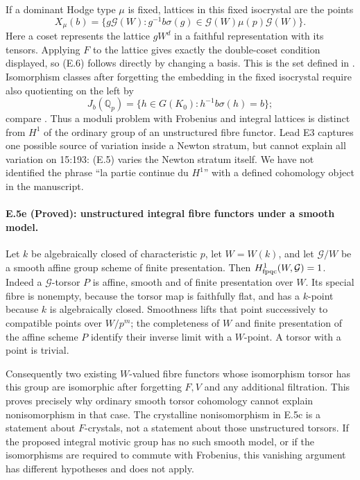 If a dominant Hodge type $\mu$ is fixed, lattices in this fixed isocrystal
are the points
\[
 X_\mu(b)=\{g\mathcal G(W):
   g^{-1}b\sigma(g)\in\mathcal G(W)\mu(p)\mathcal G(W)\}.
 \tag{E.6}
\]
Here a coset represents the lattice $gW^d$ in a faithful representation
with its tensors. Applying $F$ to the lattice gives exactly the
double-coset condition displayed, so (E.6) follows directly by changing
a basis. This is the set defined in
\citet[\S1.2.9, author-PDF p.~14]{Kisin2017}.
Isomorphism classes after forgetting the embedding in the
fixed isocrystal require also quotienting on the left by
\[
 J_b(\mathbb Q_p)=\{h\in G(K_0):h^{-1}b\sigma(h)=b\};
\]
compare \citet[\S1.2.12, author-PDF p.~14]{Kisin2017}.
Thus a moduli problem with Frobenius and integral lattices is distinct
from $H^1$ of the ordinary group of an unstructured fibre functor.
Lead E3 captures one possible source of variation inside a Newton
stratum, but cannot explain all variation on 15:193: (E.5) varies the
Newton stratum itself. We have not identified the phrase
``la partie continue du $H^1$'' with a defined cohomology object in the
manuscript.

\paragraph{E.5e (Proved): unstructured integral fibre functors under a smooth model.}
Let $k$ be algebraically closed of characteristic $p$, let $W=W(k)$,
and let $\mathcal G/W$ be a smooth affine group scheme of finite
presentation. Then
$H^1_{\rm fpqc}(W,\mathcal G)=1$.
Indeed a $\mathcal G$-torsor $P$ is affine, smooth and of finite
presentation over $W$. Its special fibre is nonempty, because the
torsor map is faithfully flat, and has a $k$-point because $k$ is
algebraically closed. Smoothness lifts that point successively to
compatible points over $W/p^m$; the completeness of $W$ and finite
presentation of the affine scheme $P$ identify their inverse limit
with a $W$-point. A torsor with a point is trivial.

Consequently two existing $W$-valued fibre functors whose isomorphism
torsor has this group are isomorphic after forgetting $F,V$ and any
additional filtration. This proves precisely why ordinary smooth
torsor cohomology cannot explain nonisomorphism in that case. The
crystalline nonisomorphism in E.5c is a statement about $F$-crystals,
not a statement about those unstructured torsors. If the proposed
integral motivic group has no such smooth model, or if the
isomorphisms are required to commute with Frobenius, this vanishing
argument has different hypotheses and does not apply.

